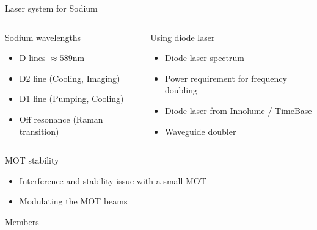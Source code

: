 \documentclass{beamer}
\begin{document}
\begin{frame}{Laser system for Sodium}
  \begin{columns}
    \column{5.8cm}
    \begin{block}{Sodium wavelengths}
      \begin{itemize}
      \item<1-> D lines $\approx589$nm
      \item<2-> D2 line (Cooling, Imaging)
      \item<3-> D1 line (Pumping, Cooling)
      \item<4-> Off resonance (Raman transition)
      \end{itemize}
    \end{block}
    \column{5.8cm}
     {
      \begin{block}{Using diode laser}
        \begin{itemize}
        \item<6-> Diode laser spectrum
        \item<8-> Power requirement for frequency doubling
        \item<9-> Diode laser from Innolume / TimeBase\\
        \item<12-> Waveguide doubler
        \end{itemize}
      \end{block}
    }
  \end{columns}
\end{frame}



\begin{frame}{MOT stability}
  \begin{itemize}[<+->]
  \item Interference and stability issue with a small MOT
  \item Modulating the MOT beams
  \end{itemize}
\end{frame}

\begin{frame}{Members}
\end{frame}
\end{document}
